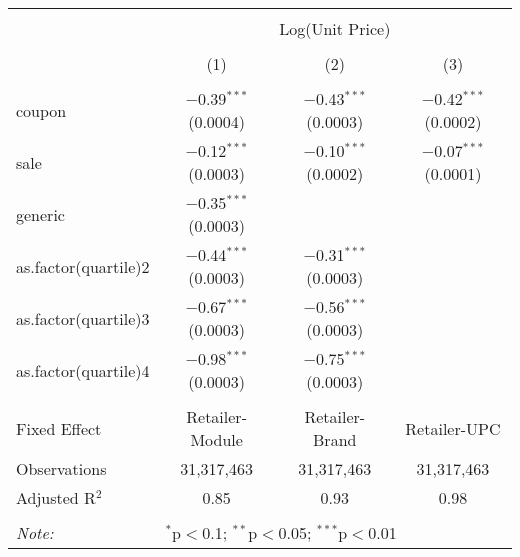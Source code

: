 
\begin{table}[!htbp] \centering 
  \caption{} 
  \label{tab:overallSavingsStorable} 
\begin{tabular}{@{\extracolsep{5pt}}lccc} 
\\[-1.8ex]\hline 
\hline \\[-1.8ex] 
 & \multicolumn{3}{c}{Log(Unit Price)} \\ 
\\[-1.8ex] & (1) & (2) & (3)\\ 
\hline \\[-1.8ex] 
 coupon & $-$0.39$^{***}$ (0.0004) & $-$0.43$^{***}$ (0.0003) & $-$0.42$^{***}$ (0.0002) \\ 
  sale & $-$0.12$^{***}$ (0.0003) & $-$0.10$^{***}$ (0.0002) & $-$0.07$^{***}$ (0.0001) \\ 
  generic & $-$0.35$^{***}$ (0.0003) &  &  \\ 
  as.factor(quartile)2 & $-$0.44$^{***}$ (0.0003) & $-$0.31$^{***}$ (0.0003) &  \\ 
  as.factor(quartile)3 & $-$0.67$^{***}$ (0.0003) & $-$0.56$^{***}$ (0.0003) &  \\ 
  as.factor(quartile)4 & $-$0.98$^{***}$ (0.0003) & $-$0.75$^{***}$ (0.0003) &  \\ 
 \hline \\[-1.8ex] 
Fixed Effect & Retailer-Module & Retailer-Brand & Retailer-UPC \\ 
Observations & 31,317,463 & 31,317,463 & 31,317,463 \\ 
Adjusted R$^{2}$ & 0.85 & 0.93 & 0.98 \\ 
\hline 
\hline \\[-1.8ex] 
\textit{Note:}  & \multicolumn{3}{l}{$^{*}$p$<$0.1; $^{**}$p$<$0.05; $^{***}$p$<$0.01} \\ 
\end{tabular} 
\end{table} 

